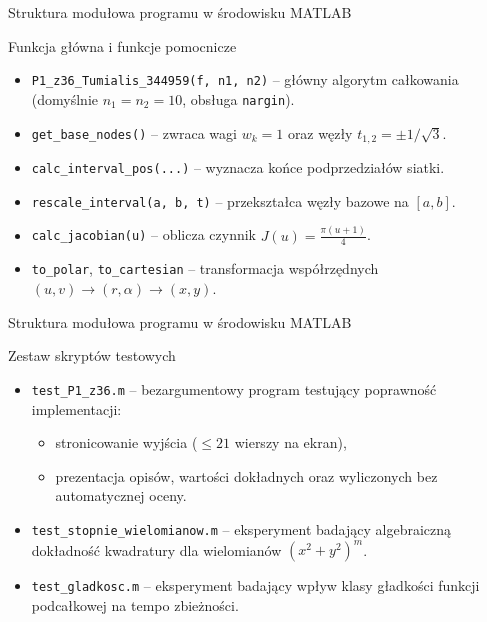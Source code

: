\documentclass[aspectratio=169, 10pt, xcolor={table}]{beamer}
\begin{document}
\begin{frame}{Struktura modułowa programu w środowisku MATLAB}

      \begin{block}{Funkcja główna i funkcje pomocnicze}
        \begin{itemize}
          \item \texttt{P1\_z36\_Tumialis\_344959(f, n1, n2)} -- główny algorytm całkowania (domyślnie $n_1 = n_2 = 10$, obsługa \texttt{nargin}).
          \item \texttt{get\_base\_nodes()} -- zwraca wagi $w_k = 1$ oraz węzły $t_{1,2} = \pm 1/\sqrt{3}$.
          \item \texttt{calc\_interval\_pos(...)} -- wyznacza końce podprzedziałów siatki.
          \item \texttt{rescale\_interval(a, b, t)} -- przekształca węzły bazowe na $[a, b]$.
          \item \texttt{calc\_jacobian(u)} -- oblicza czynnik $J(u) = \frac{\pi(u+1)}{4}$.
          \item \texttt{to\_polar}, \texttt{to\_cartesian} -- transformacja współrzędnych $(u,v) \to (r,\alpha) \to (x,y)$.
        \end{itemize}
      \end{block}
\end{frame}
\begin{frame}{Struktura modułowa programu w środowisku MATLAB}
      \begin{block}{Zestaw skryptów testowych}
        \begin{itemize}
          \item \texttt{test\_P1\_z36.m} -- bezargumentowy program testujący poprawność implementacji:
          \begin{itemize}
            \item stronicowanie wyjścia ($\le 21$ wierszy na ekran),
            \item prezentacja opisów, wartości dokładnych oraz wyliczonych bez automatycznej oceny.
          \end{itemize}
          \item \texttt{test\_stopnie\_wielomianow.m} -- eksperyment badający algebraiczną dokładność kwadratury dla wielomianów $(x^2+y^2)^m$.
          \item \texttt{test\_gladkosc.m} -- eksperyment badający wpływ klasy gładkości funkcji podcałkowej na tempo zbieżności.
        \end{itemize}
      \end{block}

\end{frame}
\end{document}
